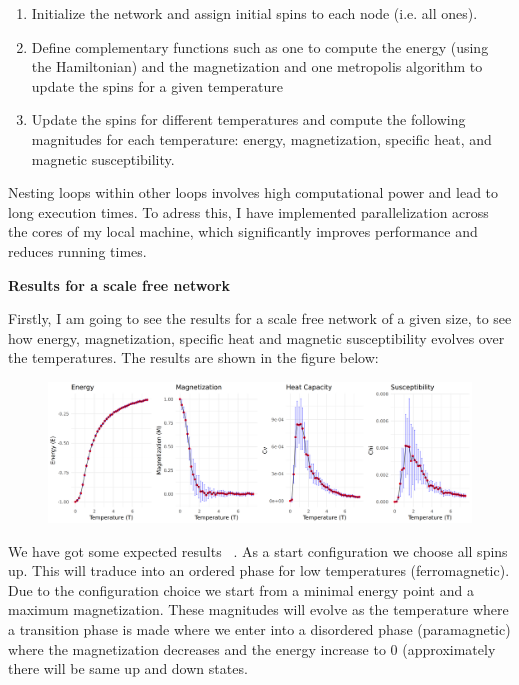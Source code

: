 \begin{enumerate}
    \item Initialize the network and assign initial spins to each node (i.e. all ones).
    \item Define complementary functions such as one to compute the energy (using the Hamiltonian) and  the magnetization and one metropolis algorithm to update the spins for a given temperature
    \item Update the spins for different temperatures and compute the following magnitudes for each temperature: energy, magnetization, specific heat, and magnetic susceptibility.
\end{enumerate}

Nesting loops within other loops involves high computational power and lead to long execution times. To adress this,  I have implemented parallelization across the cores of my local machine, which significantly improves performance and reduces running times.

\textbf{Results for a scale free network}

Firstly, I am going to see the results for a scale free network of a given size, to see how energy, magnetization, specific heat and magnetic susceptibility evolves over the temperatures. The results are shown in the figure below:

\begin{figure} [h]
    \centering
    \includegraphics[width=1\linewidth]{images/IM_scale_free.png}
\end{figure}


We have got some expected results ~\cite{farside329Lectures}. As a start configuration we choose all spins up. This will traduce into an ordered phase for low temperatures (ferromagnetic). Due to the configuration choice we start from a minimal energy point and a maximum magnetization. These magnitudes will evolve as the temperature where a transition phase is made where we enter into a disordered phase (paramagnetic) where the magnetization decreases and the energy increase to 0 (approximately there will be same up and down states.

